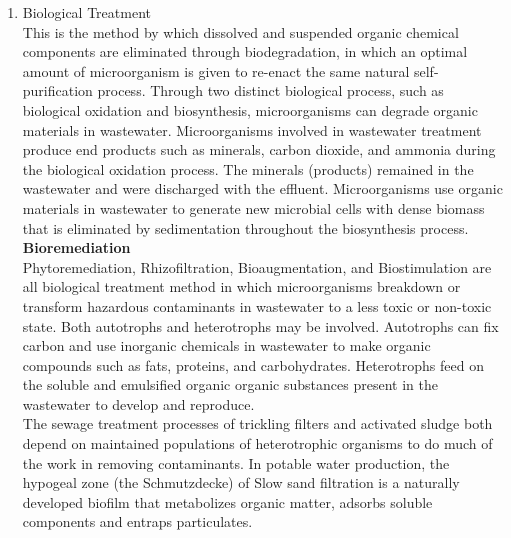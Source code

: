 \begin{enumerate}
\item Biological Treatment\\
This is the method by which dissolved and suspended organic chemical components are eliminated through biodegradation, in which an optimal amount of microorganism is given to re-enact the same natural self-purification process. Through two distinct biological process, such as biological oxidation and biosynthesis, microorganisms can degrade organic materials in wastewater. Microorganisms involved in wastewater treatment produce end products such as minerals, carbon dioxide, and ammonia during the biological oxidation process. The minerals (products) remained in the wastewater and were discharged with the effluent. Microorganisms use organic materials in wastewater to generate new microbial cells with dense biomass that is eliminated by sedimentation throughout the biosynthesis process.\\
\textbf{Bioremediation}\\
Phytoremediation, Rhizofiltration, Bioaugmentation, and Biostimulation are all biological treatment method in which microorganisms breakdown or transform hazardous contaminants in wastewater to a less toxic or non-toxic state. Both autotrophs and heterotrophs may be involved. Autotrophs can fix carbon and use inorganic chemicals in wastewater to make organic compounds such as fats, proteins, and carbohydrates. Heterotrophs feed on the soluble and emulsified organic organic substances present in the wastewater to develop and reproduce.\\
The sewage treatment processes of trickling filters and activated sludge both depend on maintained populations of heterotrophic organisms to do much of the work in removing contaminants. In potable water production, the hypogeal zone (the Schmutzdecke) of Slow sand filtration is a naturally developed biofilm that metabolizes organic matter, adsorbs soluble components and entraps particulates.
\end{enumerate}
